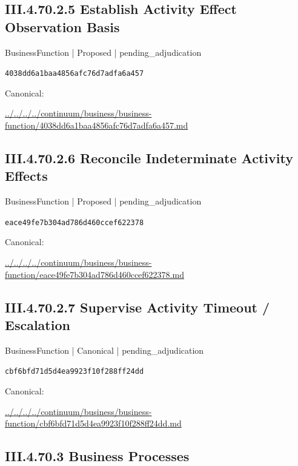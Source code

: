 \documentclass[10pt,a4paper]{article}
\begin{document}
\subsection*{III.4.70.2.5 Establish Activity Effect Observation Basis}
{\small BusinessFunction | Proposed | pending\_adjudication}\par
\texttt{4038dd6a1baa4856afc76d7adfa6a457}\par
Canonical: \par
{\footnotesize\url{../../../../continuum/business/business-function/4038dd6a1baa4856afc76d7adfa6a457.md}}\par
\subsection*{III.4.70.2.6 Reconcile Indeterminate Activity Effects}
{\small BusinessFunction | Proposed | pending\_adjudication}\par
\texttt{eace49fe7b304ad786d460ccef622378}\par
Canonical: \par
{\footnotesize\url{../../../../continuum/business/business-function/eace49fe7b304ad786d460ccef622378.md}}\par
\subsection*{III.4.70.2.7 Supervise Activity Timeout / Escalation}
{\small BusinessFunction | Canonical | pending\_adjudication}\par
\texttt{cbf6bfd71d5d4ea9923f10f288ff24dd}\par
Canonical: \par
{\footnotesize\url{../../../../continuum/business/business-function/cbf6bfd71d5d4ea9923f10f288ff24dd.md}}\par
\subsection*{III.4.70.3 Business Processes}
\end{document}

